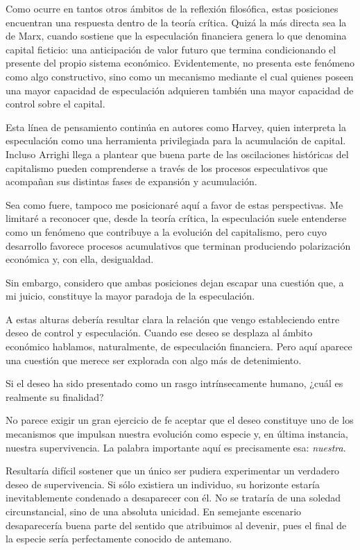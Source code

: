 \documentclass[12pt,a4paper]{article}
\begin{document}
Como ocurre en tantos otros ámbitos de la reflexión filosófica, estas posiciones encuentran una respuesta dentro de la teoría crítica. Quizá la más directa sea la de Marx, cuando sostiene que la especulación financiera genera lo que denomina capital ficticio: una anticipación de valor futuro que termina condicionando el presente del propio sistema económico. Evidentemente, no presenta este fenómeno como algo constructivo, sino como un mecanismo mediante el cual quienes poseen una mayor capacidad de especulación adquieren también una mayor capacidad de control sobre el capital.

Esta línea de pensamiento continúa en autores como Harvey, quien interpreta la especulación como una herramienta privilegiada para la acumulación de capital. Incluso Arrighi llega a plantear que buena parte de las oscilaciones históricas del capitalismo pueden comprenderse a través de los procesos especulativos que acompañan sus distintas fases de expansión y acumulación.

Sea como fuere, tampoco me posicionaré aquí a favor de estas perspectivas. Me limitaré a reconocer que, desde la teoría crítica, la especulación suele entenderse como un fenómeno que contribuye a la evolución del capitalismo, pero cuyo desarrollo favorece procesos acumulativos que terminan produciendo polarización económica y, con ella, desigualdad.

Sin embargo, considero que ambas posiciones dejan escapar una cuestión que, a mi juicio, constituye la mayor paradoja de la especulación.

A estas alturas debería resultar clara la relación que vengo estableciendo entre deseo de control y especulación. Cuando ese deseo se desplaza al ámbito económico hablamos, naturalmente, de especulación financiera. Pero aquí aparece una cuestión que merece ser explorada con algo más de detenimiento.

Si el deseo ha sido presentado como un rasgo intrínsecamente humano, ¿cuál es realmente su finalidad?

No parece exigir un gran ejercicio de fe aceptar que el deseo constituye uno de los mecanismos que impulsan nuestra evolución como especie y, en última instancia, nuestra supervivencia. La palabra importante aquí es precisamente esa: \emph{nuestra}.

Resultaría difícil sostener que un único ser pudiera experimentar un verdadero deseo de supervivencia. Si sólo existiera un individuo, su horizonte estaría inevitablemente condenado a desaparecer con él. No se trataría de una soledad circunstancial, sino de una absoluta unicidad. En semejante escenario desaparecería buena parte del sentido que atribuimos al devenir, pues el final de la especie sería perfectamente conocido de antemano.
\end{document}
